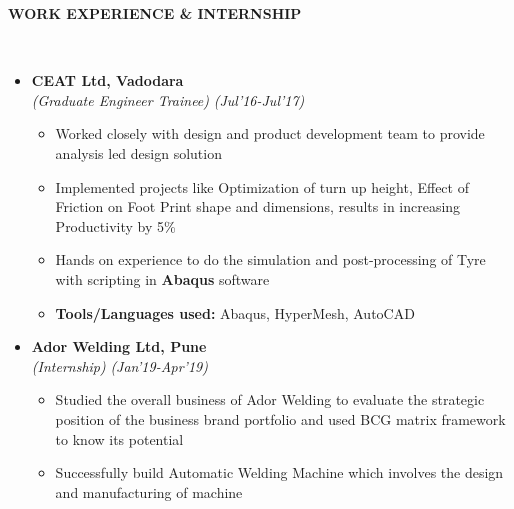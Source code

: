 \documentclass[a4paper,10pt]{article}
\newcommand{\resheading}[1]{{\small \colorbox{mygrey}{\begin{minipage}{0.99\textwidth}{\textbf{#1 \vphantom{p\^{E}}}}\end{minipage}}}}
\begin{document}
\noindent
\resheading{\textbf{WORK EXPERIENCE \& INTERNSHIP}}\\[-0.5cm]
\begin{itemize}%

\item \textbf{CEAT Ltd, Vadodara}\\
\emph{(Graduate Engineer Trainee)} \hfill \emph{(Jul'16-Jul'17)}
	\begin{itemize}[noitemsep,nolistsep]
	\item Worked closely with design and product development team to provide analysis led design solution
	\item Implemented projects like Optimization of turn up height, Effect of Friction on Foot Print shape and dimensions, results in increasing Productivity by 5\%
	\item Hands on experience to do the simulation and post-processing of Tyre with scripting in \textbf{Abaqus} software
	\item \noindent \textbf{Tools/Languages used:} Abaqus, HyperMesh, AutoCAD
    \end{itemize}
    
\item \textbf{Ador Welding Ltd, Pune} \\
\emph{(Internship)} \hfill \emph{(Jan'19-Apr'19)}
	\begin{itemize}[noitemsep,nolistsep]
    \item Studied the overall business of Ador Welding to evaluate the strategic position of the business brand portfolio and used BCG matrix framework to know its potential
    \item Successfully build Automatic Welding Machine which involves the design and manufacturing of machine
	\end{itemize}
\end{itemize}
\end{document}
